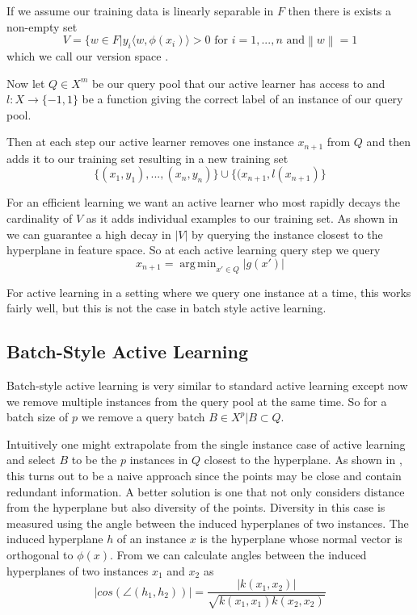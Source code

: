 \documentclass{article}
\newcommand\norm[1]{\left\lVert#1\right\rVert}
\DeclareMathOperator*{\argmin}{arg\,min}
\begin{document}
If we assume our training data is linearly separable in $F$ then there is exists a non-empty set
\[
V = \{w \in F | y_i \langle w, \phi(x_i) \rangle > 0 \text{ for } i = 1, ...,n \text{ and} \norm{w} = 1
\]
which we call our version space \cite{version_space}.

Now let $Q \in X^m$ be our query pool that our active learner has access to and
$l : X \rightarrow \{-1,1\}$ be a function giving the correct label of an instance of our query pool.

Then at each step our active learner removes one instance $x_{n+1}$ from $Q$ and then adds it to our training set resulting in a new training set
\[
\{(x_1, y_1),...,(x_n,y_n)\}\cup\{(x_{n+1}, l(x_{n+1})\}
\]


For an efficient learning we want an active learner who most rapidly decays the cardinality of $V$ as it adds individual examples to our training set. As shown in \cite{active_learning} we can guarantee a high decay in $|V|$ by querying the instance closest to the hyperplane in feature space. So at each active learning query step we query
\[
x_{n+1} = \argmin_{x' \in Q} |g(x')|
\]

For active learning in a setting where we query one instance at a time, this works fairly well, but this is not the case in batch style active learning. 

\subsection*{Batch-Style Active Learning}

Batch-style active learning is very similar to standard active learning except now we remove multiple instances from the query pool at the same time. So for a batch size of $p$ we remove a query batch
$B \in X^p | B \subset Q$.


Intuitively one might extrapolate from the single instance case of active learning and select $B$ to be the $p$ instances in $Q$ closest to the hyperplane. As shown in \cite{active_learning}, this turns out to be a naive approach since the points may be close and contain redundant information. A better solution is one that not only considers distance from the hyperplane but also diversity of the points. Diversity in this case is measured using the angle between the induced hyperplanes of two instances. The induced hyperplane $h$ of an instance $x$ is the hyperplane whose normal vector is orthogonal to $\phi(x)$. From \cite{active_learning} we can calculate angles between the induced hyperplanes of two instances $x_1$ and $x_2$ as
\[
|cos(\angle(h_1, h_2))| = \frac{|k(x_1,x_2)|}{\sqrt{k(x_1,x_1)k(x_2, x_2)}}
\]
\end{document}
